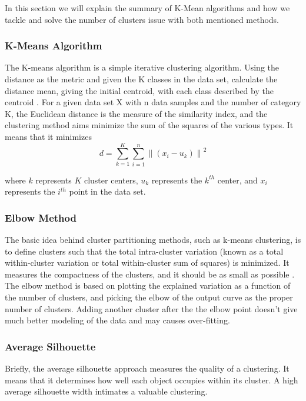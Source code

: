 \documentclass[a4paper,fleqn]{cas-dc}
\begin{document}
In this section we will explain the summary of K-Mean algorithms and how we tackle and solve the number of clusters issue with both mentioned methods.

\subsubsection{K-Means Algorithm}
\label{kmeans}
The K-means algorithm is a simple iterative clustering algorithm. Using the distance as the metric and given the K classes in the data set, calculate the distance mean, giving the initial centroid, with each class described by the centroid \citep{57yuan2019a, 60m2015a}. For a given data set X with n data samples and the number of category K, the Euclidean distance is the measure of the similarity index, and the clustering method aims minimize the sum of the squares of the various types. It means that it minimizes \citep{58wang2012a}
\begin{equation}
	d=\sum_{k=1}^{K}\sum_{i=1}^{n}\left \| (x_i-u_k) \right \|^2
\end{equation}

where $k$ represents $K$ cluster centers, $u_k$ represents the $k^{th}$ center, and $x_i$ represents the $i^{th}$ point in the data set.

\subsubsection{Elbow Method}
The basic idea behind cluster partitioning methods, such as k-means clustering, is to define clusters such that the total intra-cluster variation (known as a total within-cluster variation or total within-cluster sum of squares) is minimized. It measures the compactness of the clusters, and it should be as small as possible \citep{51kaufman2009a}. The elbow method is based on plotting the explained variation as a function of the number of clusters, and picking the elbow of the output curve as the proper number of clusters. Adding another cluster after the the elbow point doesn't give much better modeling of the data and may causes over-fitting.

\subsubsection{Average Silhouette}
Briefly, the average silhouette approach measures the quality of a clustering. It means that it determines how well each object occupies within its cluster. A high average silhouette width intimates a valuable clustering.
\end{document}
